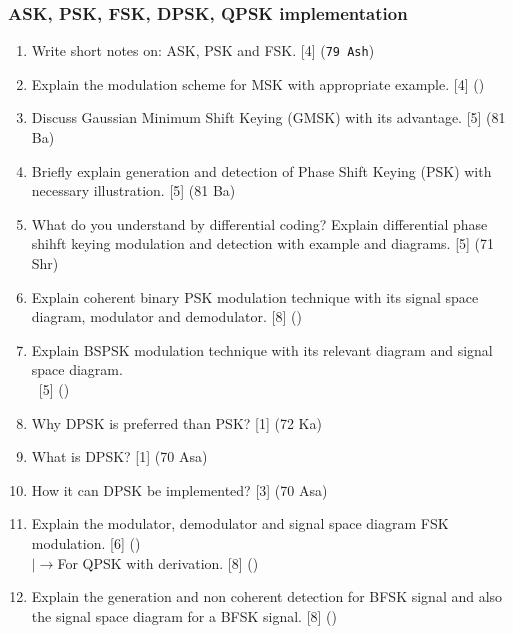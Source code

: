 \documentclass[12pt]{article}
\newcommand{\lb}{\\$\left|\rightarrow\right.$}
\newcommand{\enter}{\\\textcolor{white}{1}}
\begin{document}
    \subsubsection{ASK, PSK, FSK, DPSK, QPSK implementation}
      \begin{enumerate}
        \item Write short notes on: ASK, PSK and FSK. \hfill [4] (\texttt{79 Ash})

        \item Explain the modulation scheme for MSK with appropriate example. \hfill [4] ()
        
        \item Discuss Gaussian Minimum Shift Keying (GMSK) with its advantage. \hfill [5] (81 Ba)
        
        \item Briefly explain generation and detection of Phase Shift Keying (PSK) with necessary illustration. \hfill [5] (81 Ba)
        
        \item What do you understand by differential coding? Explain differential phase shihft keying modulation and detection with example and diagrams. \hfill [5] (71 Shr)
        
        \item Explain coherent binary PSK modulation technique with its signal space diagram, modulator and demodulator. \hfill [8] ()

        \item Explain BSPSK modulation technique with its relevant diagram and signal space diagram.
        \enter\hfill [5] ()
        
        \item Why DPSK is preferred than PSK? \hfill [1] (72 Ka)
        
        \item What is DPSK? \hfill [1] (70 Asa)
        
        \item How it can DPSK be implemented? \hfill [3] (70 Asa)
        
        \item Explain the modulator, demodulator and signal space diagram FSK modulation. \hfill [6] ()
        \lb For QPSK with derivation. \hfill [8] ()
        
        \item Explain the generation and non coherent detection for BFSK signal and also the signal space diagram for a BFSK signal. \hfill [8] ()
        

\end{enumerate}
\end{document}
